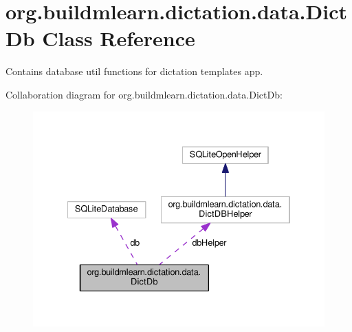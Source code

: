 \hypertarget{classorg_1_1buildmlearn_1_1dictation_1_1data_1_1DictDb}{}\section{org.\+buildmlearn.\+dictation.\+data.\+Dict\+Db Class Reference}
\label{classorg_1_1buildmlearn_1_1dictation_1_1data_1_1DictDb}


Contains database util functions for dictation template\textquotesingle{}s app.  




Collaboration diagram for org.\+buildmlearn.\+dictation.\+data.\+Dict\+Db\+:
\nopagebreak
\begin{figure}[H]
\begin{center}
\leavevmode
\includegraphics[width=334pt]{classorg_1_1buildmlearn_1_1dictation_1_1data_1_1DictDb__coll__graph}
\end{center}
\end{figure}
